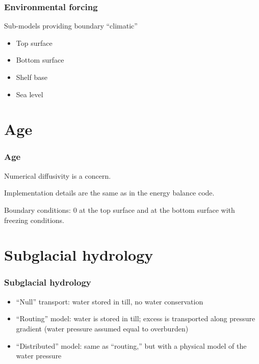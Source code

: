 \documentclass[hide notes,intlimits]{beamer}
\begin{document}
\begin{frame}
  \frametitle{Environmental forcing}

  Sub-models providing boundary ``climatic''

  \begin{itemize}
  \item Top surface
  \item Bottom surface
  \item Shelf base
  \item Sea level
  \end{itemize}
\end{frame}


\section{Age}
\label{sec:age}

\begin{frame}
  \frametitle{Age}

  Numerical diffusivity is a concern.

  Implementation details are the same as in the energy balance code.

  Boundary conditions: 0 at the top surface and at the bottom surface
  with freezing conditions.
\end{frame}

\section{Subglacial hydrology}
\label{sec:subglacial-hydrology}

\begin{frame}
  \frametitle{Subglacial hydrology}

  \begin{itemize}
  \item ``Null'' transport: water stored in till, no water conservation
  \item ``Routing'' model: water is stored in till; excess is
    transported along pressure gradient (water pressure assumed equal
    to overburden)
  \item ``Distributed'' model: same as ``routing,'' but with a
    physical model of the water pressure
  \end{itemize}
\end{frame}
\end{document}
